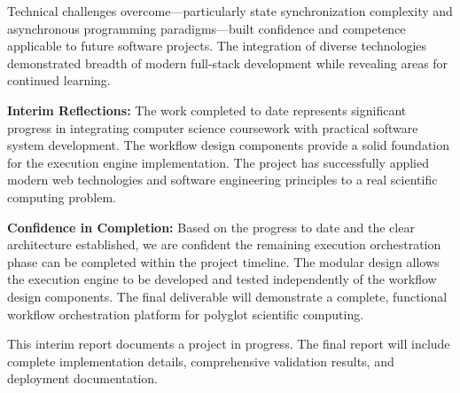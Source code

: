 \documentclass[12pt]{article}
\begin{document}
Technical challenges overcome—particularly state synchronization complexity and asynchronous programming paradigms—built confidence and competence applicable to future software projects. The integration of diverse technologies demonstrated breadth of modern full-stack development while revealing areas for continued learning.

\hspace{\parindent}\textbf{Interim Reflections:} The work completed to date represents significant progress in integrating computer science coursework with practical software system development. The workflow design components provide a solid foundation for the execution engine implementation. The project has successfully applied modern web technologies and software engineering principles to a real scientific computing problem.

\hspace{\parindent}\textbf{Confidence in Completion:} Based on the progress to date and the clear architecture established, we are confident the remaining execution orchestration phase can be completed within the project timeline. The modular design allows the execution engine to be developed and tested independently of the workflow design components. The final deliverable will demonstrate a complete, functional workflow orchestration platform for polyglot scientific computing.

\hspace{\parindent}This interim report documents a project in progress. The final report will include complete implementation details, comprehensive validation results, and deployment documentation.
\end{document}
